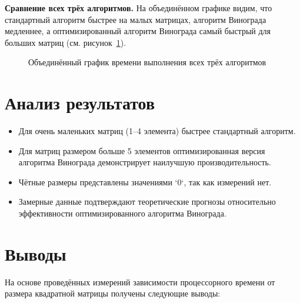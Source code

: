 \textbf{Сравнение всех трёх алгоритмов.}  
На объединённом графике видим, что стандартный алгоритм быстрее на малых матрицах, алгоритм Винограда медленнее, а оптимизированный алгоритм Винограда самый быстрый для больших матриц (см. рисунок~\ref{pic_combined}).

\begin{figure}[H]
	\caption{Объединённый график времени выполнения всех трёх алгоритмов}
	\label{pic_combined}
\end{figure}



\section{Анализ результатов}

\begin{itemize}
	\item Для очень маленьких матриц (1–4 элемента) быстрее стандартный алгоритм.
	\item Для матриц размером больше 5 элементов оптимизированная версия алгоритма Винограда демонстрирует наилучшую производительность.
	\item Чётные размеры представлены значениями `0`, так как измерений нет.
	\item Замерные данные подтверждают теоретические прогнозы относительно эффективности оптимизированного алгоритма Винограда.
\end{itemize}

\section*{Выводы}

На основе проведённых измерений зависимости процессорного времени от размера квадратной матрицы получены следующие выводы:


